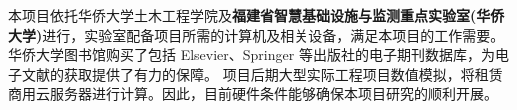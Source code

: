 本项目依托华侨大学土木工程学院及\textbf{福建省智慧基础设施与监测重点实验室(华侨大学)}进行，实验室配备项目所需的计算机及相关设备，满足本项目的工作需要。
华侨大学图书馆购买了包括 Elsevier、Springer 等出版社的电子期刊数据库，为电子文献的获取提供了有力的保障。
项目后期大型实际工程项目数值模拟，将租赁商用云服务器进行计算。因此，目前硬件条件能够确保本项目研究的顺利开展。

